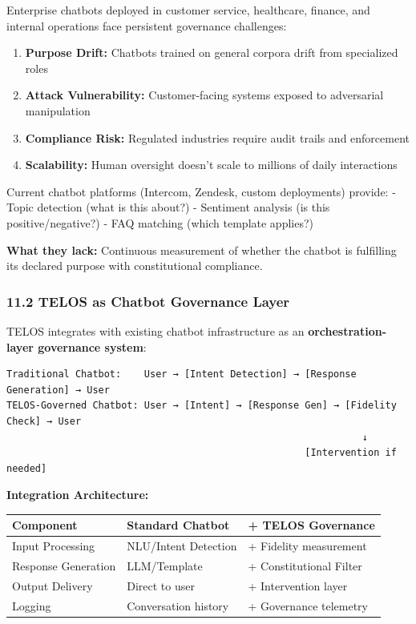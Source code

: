 Enterprise chatbots deployed in customer service, healthcare, finance,
and internal operations face persistent governance challenges:

\begin{enumerate}
\def\labelenumi{\arabic{enumi}.}
\tightlist
\item
  \textbf{Purpose Drift:} Chatbots trained on general corpora drift from
  specialized roles
\item
  \textbf{Attack Vulnerability:} Customer-facing systems exposed to
  adversarial manipulation
\item
  \textbf{Compliance Risk:} Regulated industries require audit trails
  and enforcement
\item
  \textbf{Scalability:} Human oversight doesn't scale to millions of
  daily interactions
\end{enumerate}

Current chatbot platforms (Intercom, Zendesk, custom deployments)
provide: - Topic detection (what is this about?) - Sentiment analysis
(is this positive/negative?) - FAQ matching (which template applies?)

\textbf{What they lack:} Continuous measurement of whether the chatbot
is fulfilling its declared purpose with constitutional compliance.

\subsubsection{11.2 TELOS as Chatbot Governance
Layer}\label{telos-as-chatbot-governance-layer}

TELOS integrates with existing chatbot infrastructure as an
\textbf{orchestration-layer governance system}:

\begin{verbatim}
Traditional Chatbot:    User → [Intent Detection] → [Response Generation] → User
TELOS-Governed Chatbot: User → [Intent] → [Response Gen] → [Fidelity Check] → User
                                                              ↓
                                                    [Intervention if needed]
\end{verbatim}

\textbf{Integration Architecture:}

{\def\LTcaptype{none} %
\begin{longtable}[]{@{}lll@{}}
\toprule\noalign{}
Component & Standard Chatbot & + TELOS Governance \\
\midrule\noalign{}
\endhead
\bottomrule\noalign{}
\endlastfoot
Input Processing & NLU/Intent Detection & + Fidelity measurement \\
Response Generation & LLM/Template & + Constitutional Filter \\
Output Delivery & Direct to user & + Intervention layer \\
Logging & Conversation history & + Governance telemetry \\
\end{longtable}
}

